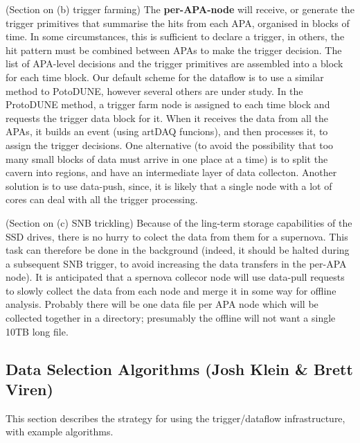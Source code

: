 (Section on (b) trigger farming) The {\bf per-APA-node} will receive,
or generate the trigger primitives that summarise the hits from each
APA, organised in blocks of time.  In some circumstances, this is
sufficient to declare a trigger, in others, the hit pattern must be
combined between APAs to make the trigger decision.  The list of
APA-level decisions and the trigger primitives are assembled into a
block for each time block.  Our default scheme for the dataflow is to
use a similar method to PotoDUNE, however several others are under
study.  In the ProtoDUNE method, a trigger farm node is assigned to
each time block and requests the trigger data block for it.  When it
receives the data from all the APAs, it builds an event (using artDAQ
funcions), and then processes it, to assign the trigger decisions.
One alternative (to avoid the possibility that too many small blocks
of data must arrive in one place at a time) is to split the cavern
into regions, and have an intermediate layer of data collecton.
Another solution is to use data-push, since, it is likely that a
single node with a lot of cores can deal with all the trigger
processing.

(Section on (c) SNB trickling) Because of the ling-term storage
capabilities of the SSD drives, there is no hurry to colect the data
from them for a supernova.  This task can therefore be done in the
background (indeed, it should be halted during a subsequent SNB
trigger, to avoid increasing the data transfers in the per-APA node).
It is anticipated that a spernova collecor node will use data-pull
requests to slowly collect the data from each node and merge it in
some way for offline analysis.  Probably there will be one data file
per APA node which will be collected together in a directory;
presumably the offline will not want a single 10TB long file.


\subsection{Data Selection Algorithms (Josh Klein \& Brett Viren)}
\label{sec:fdsp-daq-sel}

This section describes the strategy for using the trigger/dataflow infrastructure, with example algorithms.


